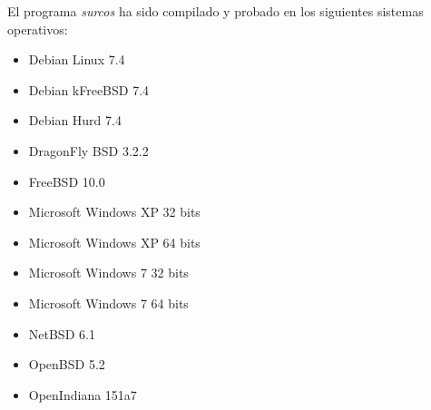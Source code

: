 El programa \emph{surcos} ha sido compilado y probado en los siguientes sistemas
operativos:
\begin{itemize}
\item Debian Linux 7.4
\item Debian kFreeBSD 7.4
\item Debian Hurd 7.4
\item DragonFly BSD 3.2.2
\item FreeBSD 10.0
\item Microsoft Windows XP 32 bits
\item Microsoft Windows XP 64 bits
\item Microsoft Windows 7 32 bits
\item Microsoft Windows 7 64 bits
\item NetBSD 6.1
\item OpenBSD 5.2
\item OpenIndiana 151a7
\end{itemize}

